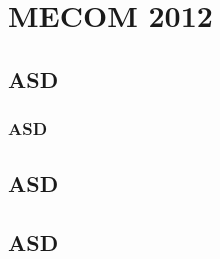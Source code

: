 
\chapter{MECOM 2012} %

\label{C3} %



\section{ASD}




\subsection{ASD}




\section{ASD}



\section{ASD}

